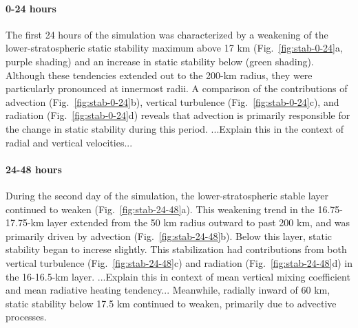 \documentclass{ametsoc}
\begin{document}
\paragraph{0-24 hours}
The first 24 hours of the simulation was characterized by a weakening of the lower-stratospheric static stability maximum above 17 km (Fig.~\ref{fig:stab-0-24}a, purple shading) and an increase in static stability below (green shading).
Although these tendencies extended out to the 200-km radius, they were particularly pronounced at innermost radii.
A comparison of the contributions of advection (Fig.~\ref{fig:stab-0-24}b), vertical turbulence (Fig.~\ref{fig:stab-0-24}c), and radiation (Fig.~\ref{fig:stab-0-24}d) reveals that advection is primarily responsible for the change in static stability during this period.
...Explain this in the context of radial and vertical velocities...

\paragraph{24-48 hours}
During the second day of the simulation, the lower-stratospheric stable layer continued to weaken (Fig.~\ref{fig:stab-24-48}a).
This weakening trend in the 16.75-17.75-km layer extended from the 50 km radius outward to past 200 km, and was primarily driven by advection (Fig.~\ref{fig:stab-24-48}b).
Below this layer, static stability began to increse slightly.
This stabilization had contributions from both vertical turbulence (Fig.~\ref{fig:stab-24-48}c) and radiation (Fig.~\ref{fig:stab-24-48}d) in the 16-16.5-km layer.
...Explain this in context of mean vertical mixing coefficient and mean radiative heating tendency...
Meanwhile, radially inward of 60 km, static stability below 17.5 km continued to weaken, primarily due to advective processes.
\end{document}
